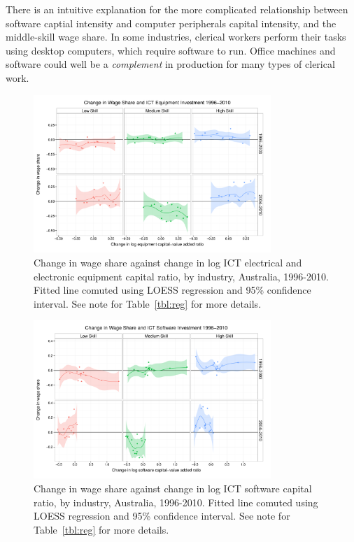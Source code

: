 \documentclass[a4paper]{article}
\begin{document}
There is an intuitive explanation for the more complicated relationship between software captial intensity and computer peripherals capital intensity, and the middle-skill wage share. In some industries, clerical workers perform their tasks using desktop computers, which require software to run. Office machines and software could well be a {\em complement} in production for many types of clerical work.

\begin{figure}
  \centering
  \includegraphics[width=0.8\textwidth]{../figure/wage_share_equipment_skill_split.pdf}
  \caption{Change in wage share against change in log ICT electrical and electronic equipment capital ratio, by industry, Australia, 1996-2010.
    Fitted line comuted using LOESS regression and 95\% confidence interval. See note for Table~\ref{tbl:reg} for more details.
  }
  \label{fig:equip}
\end{figure}

\begin{figure}
  \centering
  \includegraphics[width=0.8\textwidth]{../figure/wage_share_software_skill_split.pdf}
  \caption{Change in wage share against change in log ICT software capital ratio, by industry, Australia, 1996-2010. Fitted line comuted using LOESS regression and 95\% confidence interval.
    See note for Table~\ref{tbl:reg} for more details.
  }
  \label{fig:soft}
\end{figure}
\end{document}
